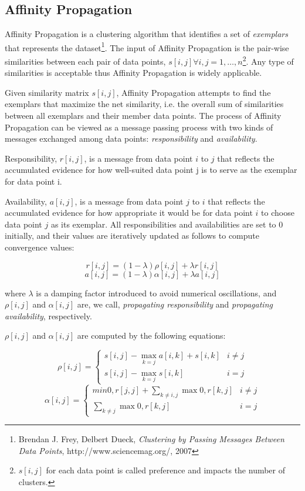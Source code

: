 \subsection{Affinity Propagation}

Affinity Propagation is a clustering algorithm that identifies a set of \textit{exemplars} that represents the dataset\footnote{Brendan J. Frey, Delbert Dueck, \emph{Clustering by Passing Messages
Between Data Points}, http://www.sciencemag.org/, 2007}. The input of Affinity Propagation is the pair-wise similarities between each pair of data points, $s[i, j] \forall i, j = 1, \ldots, n$\footnote{$s[i,j]$ for each data point is called preference and impacts the number of clusters.}. Any type of similarities is acceptable thus Affinity Propagation is widely applicable.

Given similarity matrix $s[i, j]$, Affinity Propagation attempts to find the exemplars that maximize the net similarity, i.e. the overall sum of similarities between all exemplars and their member data points. The process of Affinity Propagation can be viewed as a message passing process with two
kinds of messages exchanged among data points: \emph{responsibility} and \emph{availability}. 

Responsibility, $r[i, j]$, is a message from data point $i$ to $j$ that reflects the accumulated evidence for how well-suited data point j is to serve as the exemplar for data point i. 

Availability, $a[i, j]$, is a message from data point $j$ to $i$ that reflects the accumulated evidence for how appropriate it would be for data point $i$ to choose data point $j$ as
its exemplar. All responsibilities and availabilities are set to $0$ initially, and their values are iteratively updated as follows to compute convergence values:

$$r[i, j] = (1-\lambda)\rho [i, j] + \lambda r[i, j]$$
$$a[i, j] = (1 -\lambda) \alpha[i, j] + \lambda a[i, j]$$

where $\lambda$ is a damping factor introduced to avoid numerical oscillations, and $\rho[i, j]$ and $\alpha[i, j]$ are, we call, \emph{propagating responsibility} and \emph{propagating availability}, respectively. 

$\rho[i, j]$ and $\alpha[i, j]$ are computed by the following equations:

$$
\rho[i, j] =
\left\{
\begin{array}{lr}
s[i, j] − \max_{k=j}a[i, k] + s[i, k] & i \neq j\\
s[i, j] − \max_{k=j}s[i, k]  &  i= j 
\end{array}
\right.
$$
$$
\alpha[i, j] =
\left\{
\begin{array}{lr}
min{0, r[j, j] + \sum_{k \neq i, j} \max 0, r[k, j]} & i \neq j\\
\sum_{k\neq j} \max {0, r[k, j]}  &  i= j 
\end{array}
\right.
$$

